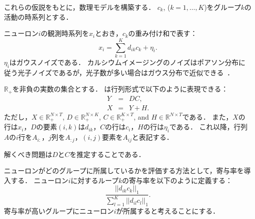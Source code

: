 これらの仮説をもとに，数理モデルを構築する．
$c_k$, ($k=1,\dots,K$)をグループ$k$の活動の時系列とする．

ニューロン$i$の観測時系列を$x_i$とおき，$c_k$の重み付け和で表す：
\begin{equation}
  x_i = \sum_{k=1}^K d_{ik} c_k + \eta_i.
  \label{eq:x}
\end{equation}
$\eta_i$はガウスノイズである．
カルシウムイメージングのノイズはポアソン分布に従う光子ノイズであるが，光子数が多い場合はガウス分布で近似できる~\cite{Sjulson2007}．

$\mathbb{R}_+$を非負の実数の集合とする．
は行列形式で以下のように表現できる：
\begin{eqnarray}
  Y &=& DC, \\
  X &=& Y + H.
  \label{model_matrix}
\end{eqnarray}
ただし，$X \in \mathbb{R}_+^{N \times T}$, $D \in \mathbb{R}_+^{N \times K}$, $C \in \mathbb{R}_+^{K \times T}$, and $H \in \mathbb{R}^{N \times T}$である．
また，$X$の行は$x_i$，$D$の要素$(i,k)$は$d_{ik}$，$C$の行は$c_i$，$H$の行は$\eta_i$である．
これ以降，行列$A$の$i$行を$A_{i:}$，$j$列を$A_{:j}$，$(i,j)$要素を$A_{ij}$と表記する．

解くべき問題は$D$と$C$を推定することである．

ニューロンがどのグループに所属しているかを評価する方法として，寄与率を導入する．
ニューロン$i$に対するループ$k$の寄与率を以下のように定義する：
\begin{equation}
	\frac{|| d_{ik} c_k ||_1}{\sum_{l=1}^K || d_{il} c_l ||_1}.
  \label{eq:pov}
\end{equation}
寄与率が高いグループにニューロン$i$が所属すると考えることにする．
